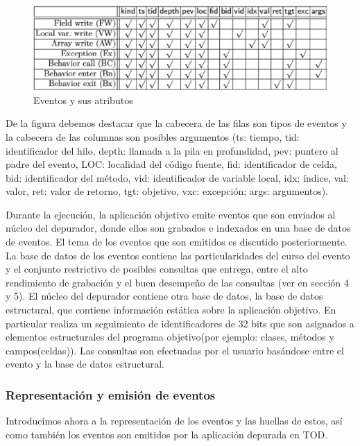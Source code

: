 \documentclass[12pt,legalpaper]{report}
\begin{document}
\begin{figure}[hpb]
	\centering
	\includegraphics[scale=0.5]{images/TOD/EventsAttributes.eps}
	\caption{Eventos y sus atributos}
	\label{EventsAttributes}
\end{figure}

De la figura debemos destacar que la cabecera de las filas son tipos de eventos y la cabecera de las columnas son posibles argumentos (ts: tiempo, tid: identificador del hilo, depth: llamada a la pila en profundidad, pev: puntero al padre del evento, LOC: localidad del código fuente, fid: identificador de celda, bid: identificador del método, vid: identificador de variable local, idx: índice, val: valor, ret: valor de retorno, tgt: objetivo, vxc: excepción; args: argumentos).

Durante la ejecución, la aplicación objetivo emite eventos que son enviados al núcleo del depurador, donde ellos son grabados e indexados en una base de datos de eventos.  El tema de los eventos que son emitidos es discutido posteriormente.  La base de datos de los eventos contiene las particularidades del curso del evento y el conjunto restrictivo de posibles consultas que entrega, entre el alto rendimiento de grabación y el buen desempeño de las consultas (ver en sección 4 y 5).  El núcleo del depurador contiene otra base de datos, la base de datos estructural, que contiene información estática sobre la aplicación objetivo.  En particular realiza un seguimiento de identificadores de 32 bits que son asignados a elementos estructurales del programa objetivo(por ejemplo: clases, métodos y campos(celdas)).  Las consultas son efectuadas por el usuario basándose entre el evento y la base de datos estructural.

			\subsubsection{Representación y emisión de eventos}

Introducimos ahora a la representación de los eventos y las huellas de estos, así como también los eventos son emitidos por la aplicación depurada en TOD.
\end{document}
